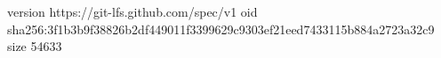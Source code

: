 version https://git-lfs.github.com/spec/v1
oid sha256:3f1b3b9f38826b2df449011f3399629c9303ef21eed7433115b884a2723a32c9
size 54633
